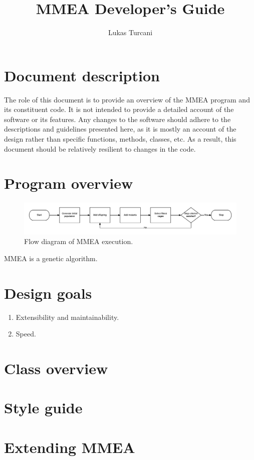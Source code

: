 \documentclass[a4paper, titlepage]{article}
\title{MMEA Developer's Guide}
\author{Lukas Turcani}
\begin{document}
\maketitle
\tableofcontents
\pagebreak

\section{Document description}
The role of this document is to provide an overview of the MMEA program and its constituent code. It is not intended to provide a detailed account of the software or its features. Any changes to the software should adhere to the descriptions and guidelines presented here, as it is mostly an account of the design rather than specific functions, methods, classes, etc. As a result, this document should be relatively resilient to changes in the code.
       
\section{Program overview}

\begin{figure}[h]
	\centering
	\includegraphics[width=\textwidth]{./figures/program_overview/MMEA_flow_horizontal.png}
	\caption{Flow diagram of MMEA execution.}
	\label{flow_diagram}
\end{figure}

MMEA is a genetic algorithm.

\section{Design goals}

\begin{enumerate}
	\item Extensibility and maintainability.
	\item Speed.
\end{enumerate}

\section{Class overview}

\section{Style guide}

\section{Extending MMEA}
\end{document}
